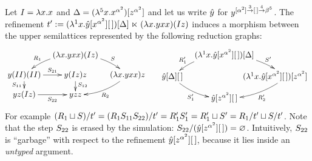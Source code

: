 \begin{example}
Let $I = \lambda x. x$
and $\Delta = (\lambda^{5} x. x^{\alpha^2})[z^{\alpha^2}]$
and let us write $\hat{y}$ for $y^{[\alpha^2] \overset{3}{\to} [\,] \overset{4}{\to} \beta^5}$.
The refinement $t' := (\lambda^{1} x. \hat{y}[x^{\alpha^2}][\,])[\Delta] \mathrel{\ltimes} (\lambda x. yxx)(Iz)$
induces a morphism between the upper semilattices represented by the following reduction graphs:
\[
  \xymatrix@R=.3cm@C=.3cm{
  &
    (\lam{\var}{\vartwo\var\var})(I\varthree)
    \ar@/_.25cm/[dl]_-{\redex_1}
    \ar@/^.25cm/[dr]^-{\redextwo}
  &
  &
  \\
    \vartwo(II)(II)
    \ar[d]_-{\redextwo_{11}}
    \ar[r]^-{\redextwo_{21}}
  &
    \vartwo(I\varthree)\varthree
    \ar[d]^{\redextwo_{12}}
  &
    (\lam{\var}{\vartwo\var\var})\varthree
    \ar@/^.25cm/[dl]^-{\redex_2}
  \\
    \vartwo \varthree (I\varthree)
    \ar[r]_-{\redextwo_{22}}
  &
    \vartwo \varthree \varthree
  }
  \xymatrix@R=.3cm@C=.3cm{
  &
    (\lamp{1}{\var}{\hat{\vartwo}[\var^{\alpha^2}][\,]})[\Delta]
    \ar@/_.25cm/[dl]_-{\redex'_1}
    \ar@/^.25cm/[dr]^-{\redextwo'}
  \\
    \hat{\vartwo}[\Delta][\,]
    \ar@/_.25cm/[dr]_-{\redextwo'_1}
  &
  &
    \hspace{-1cm}(\lamp{1}{\var}{\hat{\vartwo}[\var^{\alpha^2}][\,]})[\varthree^{\alpha^2}]
    \ar@/^.25cm/[dl]^-{\redex'_2}
  \\
  &
    \hat{\vartwo}[\varthree^{\alpha^2}][\,]
  }
\]
For example
$(R_1 \sqcup S)/t' = (R_1S_{11}S_{22})/t' = R'_1S'_1 = R'_1 \sqcup S' = R_1/t' \sqcup S/t'$.
Note that the step $S_{22}$ is erased by the simulation: $S_{22}/(\hat{y}[z^{\alpha^2}][\,]) = \varnothing$.
Intuitively, $S_{22}$ is ``garbage'' with respect to the refinement $\hat{y}[z^{\alpha^2}][\,]$,
because it lies inside an {\em untyped} argument.
\end{example}

